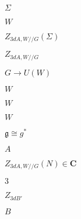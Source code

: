\begin{preview}
\setcounter{equation}{0}%
\( \Sigma \)
\end{preview}

\begin{preview}
\setcounter{equation}{0}%
\( W \)
\end{preview}

\begin{preview}
\setcounter{equation}{0}%
\(  Z_{3dA, W //G} ( \Sigma) \)
\end{preview}

\begin{preview}
\setcounter{equation}{0}%
\( Z_{3dA, W/ /G} \)
\end{preview}

\begin{preview}
\setcounter{equation}{0}%
\( G \to U(W) \)
\end{preview}

\begin{preview}
\setcounter{equation}{0}%
\( W \)
\end{preview}

\begin{preview}
\setcounter{equation}{0}%
\( W \)
\end{preview}

\begin{preview}
\setcounter{equation}{0}%
\( W  \)
\end{preview}

\begin{preview}
\setcounter{equation}{0}%
\( \mathfrak{g} \cong  g^{*}\)
\end{preview}

\begin{preview}
\setcounter{equation}{0}%
\( A \)
\end{preview}

\begin{preview}
\setcounter{equation}{0}%
\(  Z_{3dA, W // G}(N)\in \mathbf{C} \)
\end{preview}

\begin{preview}
\setcounter{equation}{0}%
\( 3 \)
\end{preview}

\begin{preview}
\setcounter{equation}{0}%
\( Z_{3dB'} \)
\end{preview}

\begin{preview}
\setcounter{equation}{0}%
\( B \)
\end{preview}

